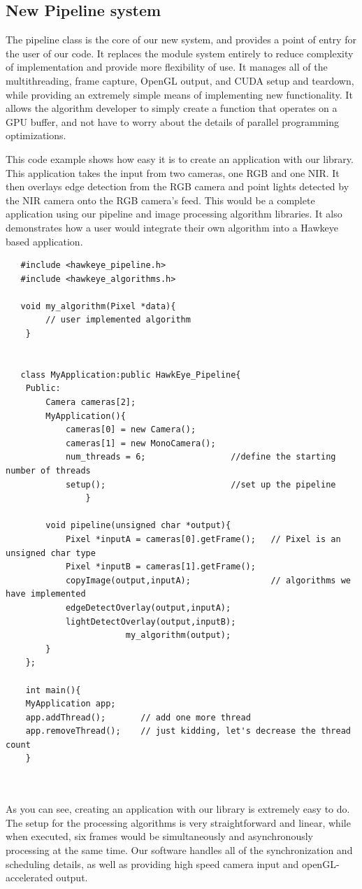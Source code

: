 \documentclass[letterpaper,10pt,titlepage]{IEEEtran}
\begin{document}
   \subsection{New Pipeline system}
   The pipeline class is the core of our new system, and provides a point of entry for the user of our code. It replaces the module system entirely to reduce complexity of implementation and provide more flexibility of use. It manages all of the multithreading, frame capture, OpenGL output, and CUDA setup and teardown, while providing an extremely simple means of implementing new functionality. It allows the algorithm developer to simply create a function that operates on a GPU buffer, and not have to worry about the details of parallel programming optimizations. 
   \par This code example shows how easy it is to create an application with our library. This application takes the input from two cameras, one RGB and one NIR. It then overlays edge detection from the RGB camera and point lights detected by the NIR camera onto the RGB camera's feed. This would be a complete application using our pipeline and image processing algorithm libraries. It also demonstrates how a user would integrate their own algorithm into a Hawkeye based application.
   \begin{lstlisting}
   #include <hawkeye_pipeline.h>
   #include <hawkeye_algorithms.h>
   
   void my_algorithm(Pixel *data){
        // user implemented algorithm
    }
   
   
   class MyApplication:public HawkEye_Pipeline{
	Public:
		Camera cameras[2];
		MyApplication(){
			cameras[0] = new Camera();
			cameras[1] = new MonoCamera();
			num_threads = 6;                 //define the starting number of threads
			setup();                         //set up the pipeline
                }
		
		void pipeline(unsigned char *output){
			Pixel *inputA = cameras[0].getFrame();   // Pixel is an unsigned char type
			Pixel *inputB = cameras[1].getFrame();
			copyImage(output,inputA);                // algorithms we have implemented
			edgeDetectOverlay(output,inputA);        
			lightDetectOverlay(output,inputB);
                        my_algorithm(output);
		}
    };

    int main(){
	MyApplication app;
	app.addThread();       // add one more thread
	app.removeThread();    // just kidding, let's decrease the thread count
    }

   
   \end{lstlisting}
   \par As you can see, creating an application with our library is extremely easy to do. The setup for the processing algorithms is very straightforward and linear, while when executed, six frames would be simultaneously and asynchronously processing at the same time. Our software handles all of the synchronization and scheduling details, as well as providing high speed camera input and openGL-accelerated output. 
   
   
   
\end{document}
